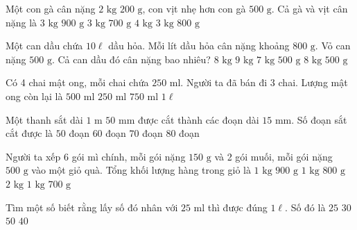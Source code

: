 \begin{ex} %
Một con gà cân nặng $2\text{ kg } 200\text{ g}$, con vịt nhẹ hơn con gà $500\text{ g}$. Cả gà và vịt cân nặng là
\choice
{\True $3\text{ kg } 900\text{ g}$}
{$3\text{ kg } 700\text{ g}$}
{$4\text{ kg}$}
{$3\text{ kg } 800\text{ g}$}
\end{ex}

\begin{ex} %
Một can dầu chứa $10\ell$ dầu hỏa. Mỗi lít dầu hỏa cân nặng khoảng $800\text{ g}$. Vỏ can nặng $500\text{ g}$. Cả can dầu đó cân nặng bao nhiêu?
\choice
{$8\text{ kg}$}
{$9\text{ kg}$}
{$7\text{ kg } 500\text{ g}$}
{\True $8\text{ kg } 500\text{ g}$}
\end{ex}

\begin{ex} %
Có 4 chai mật ong, mỗi chai chứa $250\text{ ml}$. Người ta đã bán đi 3 chai. Lượng mật ong còn lại là
\choice
{$500\text{ ml}$}
{\True $250\text{ ml}$}
{$750\text{ ml}$}
{$1\ell$}
\end{ex}

\begin{ex} %
Một thanh sắt dài $1\text{ m } 50\text{ mm}$ được cắt thành các đoạn dài $15\text{ mm}$. Số đoạn sắt cắt được là
\choice
{$50$ đoạn}
{$60$ đoạn}
{\True $70$ đoạn}
{$80$ đoạn}
\end{ex}

\begin{ex} %
Người ta xếp 6 gói mì chính, mỗi gói nặng $150\text{ g}$ và 2 gói muối, mỗi gói nặng $500\text{ g}$ vào một giỏ quà. Tổng khối lượng hàng trong giỏ là
\choice
{\True $1\text{ kg } 900\text{ g}$}
{$1\text{ kg } 800\text{ g}$}
{$2\text{ kg}$}
{$1\text{ kg } 700\text{ g}$}
\end{ex}

\begin{ex} %
Tìm một số biết rằng lấy số đó nhân với $25\text{ ml}$ thì được đúng $1\ell$. Số đó là
\choice
{$25$}
{$30$}
{$50$}
{\True $40$}
\end{ex}


